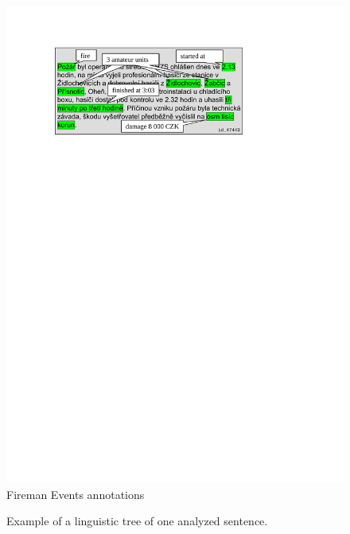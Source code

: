 \begin{figure}
\centering
\includegraphics[width=0.65\hsize]{fireman_annotated}
\caption{Fireman Events annotations}
\label{fig:fireman_annotated}
\end{figure}


\begin{figure}
\centerline{}
\caption{Example of a linguistic tree of one analyzed sentence.}
\label{fig:intro_damage_tree} 
\end{figure}


